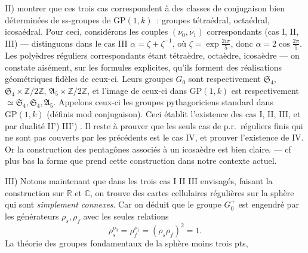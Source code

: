 \documentclass[11pt,a4paper]{article}
\begin{document}
II) \struck{\ill{} \ill{}}   montrer que ces
trois cas correspondent  à des classes de conjugaison bien déterminées
de ss-groupes de $\mathrm{GP}(1, k)$~: groupes tétraédral, octaédral,
icosaédral. Pour ceci, considérons les couples $(\nu_0, \nu_1)$
correspondants (cas I, II, III) --- distinguons dans le cas III
$\alpha = \zeta + \zeta^{-1}$, où $\zeta = \exp\frac{2i\pi}{5}$, donc
$\alpha = 2\cos\frac{2\pi}{5}$.  Les polyèdres réguliers
correspondants étant \ill{} tétraèdre, octaèdre, icosaèdre --- on constate
aisément, sur les formules explicites, qu'ils forment des réalisations
géométriques  fidèles de ceux-ci. Leurs groupes $G_0$ sont
respectivement 
$\mathfrak{S}_4$, $\mathfrak{S}_4 \times \mathbb{Z}/2\mathbb{Z}$,
$\mathfrak{A}_5 \times \mathbb{Z}/2\mathbb{Z}$, et l'image de ceux-ci dans
$\mathrm{GP}(1, k)$ est respectivement $\simeq \mathfrak{S}_4,
\mathfrak{S}_4, \mathfrak{A}_5$. Appelons ceux-ci les groupes pythagoriciens
standard  dans $\mathrm{GP}(1, k)$ (définis
mod conjugaison). Ceci établit l'existence des cas I, II, III, et par
dualité II') III') . Il reste à prouver que les seuls cas
de p.r.\ réguliers finis qui ne sont pas couverts par les précédents est le
cas IV, et prouver  l'existence de IV. Or  la construction des pentagônes associés à un icosaèdre est bien
claire. --- cf plus bas la forme que prend cette construction dans notre
contexte actuel.



III) Notons maintenant que dans les trois cas I II III envisagés, faisant
la construction sur $\mathbb{R}$ et $\mathbb{C}$, on trouve des cartes
cellulaires régulières sur la sphère qui sont \emph{simplement connexes}.
Car on déduit  que le groupe
$G_0^{+}$ 
est engendré par les générateurs $\rho_s, \rho_f$ avec les seules
relations
\[
\rho_s^{\nu_0} = \rho_f^{\nu_1} = (\rho_s\rho_f)^2 = 1.
\]
La théorie  des groupes fondamentaux de la sphère
moins trois pts, \struck{\ill{}}
\end{document}

